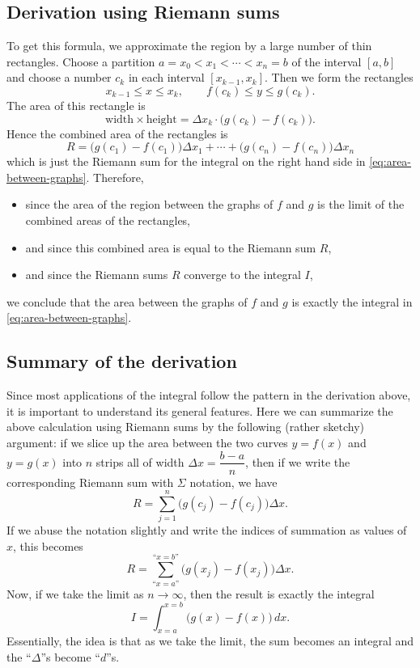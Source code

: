 \subsection{Derivation using Riemann sums} %
To get this formula, we approximate the region by a large number of thin
rectangles.  Choose a partition $a=x_0<x_1<\cdots<x_n=b$ of the interval
$[a,b]$ and choose a number $c_k$ in each interval $[x_{k-1}, x_k]$. Then we form the
rectangles
\[
x_{k-1} \leq x\leq x_k,\qquad f(c_k)\leq y\leq g(c_k).
\]
The area of this rectangle is
\[
\text{width}\times\text{height} = \Delta x_k\cdot\bigl(g(c_k) - f(c_k)\bigr).
\]
Hence the combined area of the rectangles is
\[
R= \bigl(g(c_1) - f(c_1)\bigr)\Delta x_1 + \cdots + \bigl(g(c_n) -
f(c_n)\bigr)\Delta x_n
\]
which is just the Riemann sum for the integral on the right hand side in
\eqref{eq:area-between-graphs}.  Therefore,
\begin{itemize}

\item since the area of the region between the graphs of $f$ and $g$ is the
  limit of the combined areas of the rectangles,

\item and since this combined area is equal to the Riemann sum $R$,

\item and since the Riemann sums $R$ converge to the integral $I$,

\end{itemize}
we conclude that the area between the graphs of $f$ and $g$ is exactly the
integral in \eqref{eq:area-between-graphs}.

\subsection{Summary of the derivation} %
Since most applications of the integral follow the pattern in the derivation
above, it is important to understand its general features.
Here we can summarize the above calculation using Riemann sums by the following
(rather sketchy) argument: if we slice up the area between the two curves
$y=f(x)$ and $y=g(x)$ into $n$ strips all of width $\Delta x = \dfrac{b-a}{n}$,
then if we write the corresponding Riemann sum with $\Sigma$ notation, we have
\[
R= \sum_{j=1}^{n}\bigl(g(c_j) - f(c_j)\bigr)\Delta x.
\]
If we abuse the notation slightly and write the indices of summation as values
of $x$, this becomes
\[
R= \sum_{\text{``$x=a$''}}^{\text{``$x=b$''}}\bigl(g(x_j) - f(x_j)\bigr)\Delta x.
\]
Now, if we take the limit as $n \to \infty$, then the result is exactly the integral
\[
I= \int_{x=a}^{x=b}\bigl(g(x) - f(x)\bigr) \, dx.
\]
Essentially, the idea is that as we take the limit, the sum becomes an integral
and the ``$\Delta$''s become ``$d$''s.

